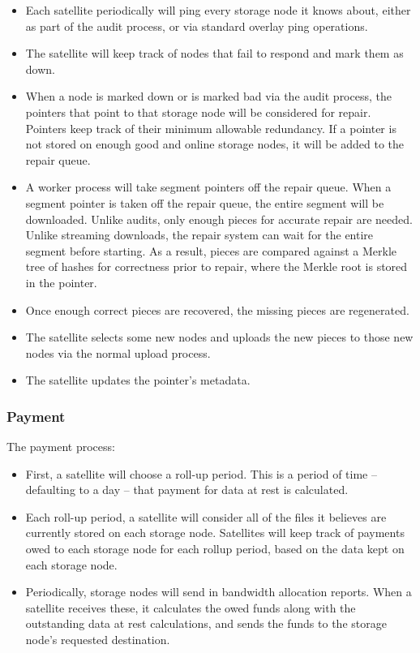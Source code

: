 \documentclass[a4paper,10pt]{article} \usepackage[utf8]{inputenc}
\begin{document}
\begin{itemize}
\item Each satellite periodically will ping every storage node it knows 
about,
  either as part of the audit process, or via standard overlay ping operations.
\item The satellite will keep track of nodes that fail to respond and mark
  them as down.
\item When a node is marked down or is marked bad via the audit process, the
  pointers that point to that storage node will be considered for repair. 
  Pointers
  keep track of their minimum allowable redundancy. If a pointer is not stored
  on enough good and online storage nodes, it will be added to the repair queue.
\item A worker process will take segment pointers off the repair queue. When
  a segment pointer is taken off the repair queue, the entire segment will be
  downloaded. Unlike audits, only enough pieces for accurate repair are needed.
  Unlike streaming downloads, the repair system can wait for the entire segment
  before starting. As a result, pieces are compared against a Merkle tree of
  hashes for correctness prior to repair, where the Merkle root is stored in
  the pointer.
\item Once enough correct pieces are recovered, the missing pieces are
  regenerated.
\item The satellite selects some new nodes and uploads the new pieces to
  those new nodes via the normal upload process.
\item The satellite updates the pointer's metadata.
\end{itemize}

\subsubsection{Payment}

The payment process: 

\begin{itemize}
\item First, a satellite will choose a roll-up period. This is a period of
  time -- defaulting to a day -- that payment for data at rest is calculated.
\item Each roll-up period, a satellite will consider all of the files it
  believes are currently stored on each storage node. Satellites will keep track
of payments owed to each storage node for each rollup period, based on 
the data kept on each storage node.
\item Periodically, storage nodes will send in bandwidth allocation reports. 
When a
  satellite receives these, it calculates the owed funds along with the
  outstanding data at rest calculations, and sends the funds to the storage 
  node's requested destination.
\end{itemize}
\end{document}
